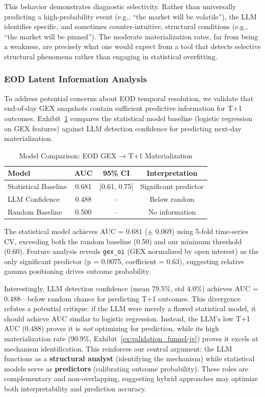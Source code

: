 This behavior demonstrates diagnostic selectivity. Rather than universally predicting a high-probability event (e.g., ``the market will be volatile''), the LLM identifies specific, and sometimes counter-intuitive, structural conditions (e.g., ``the market will be pinned''). The moderate materialization rates, far from being a weakness, are precisely what one would expect from a tool that detects selective structural phenomena rather than engaging in statistical overfitting.

\subsubsection{EOD Latent Information Analysis}

To address potential concerns about EOD temporal resolution, we validate that end-of-day GEX snapshots contain sufficient predictive information for T+1 outcomes. Exhibit~\ref{ex:eod_baseline-jv} compares the statistical model baseline (logistic regression on GEX features) against LLM detection confidence for predicting next-day materialization.

\begin{table}[htbp]
\centering
\caption{Model Comparison: EOD GEX → T+1 Materialization}
\label{ex:eod_baseline-jv}
\small
\begin{tabular}{lccc}
\toprule
Model & AUC & 95\% CI & Interpretation \\
\midrule
Statistical Baseline & 0.681 & [0.61, 0.75] & Significant predictor \\
LLM Confidence & 0.488 & -- & Below random \\
Random Baseline & 0.500 & -- & No information \\
\bottomrule
\end{tabular}
\end{table}

The statistical model achieves AUC = 0.681 ($\pm$ 0.069) using 5-fold time-series CV, exceeding both the random baseline (0.50) and our minimum threshold (0.60). Feature analysis reveals \texttt{gex\_oi} (GEX normalized by open interest) as the only significant predictor (p = 0.0075, coefficient = 0.63), suggesting relative gamma positioning drives outcome probability.

Interestingly, LLM detection confidence (mean 79.5\%, std 4.0\%) achieves AUC = 0.488—below random chance for predicting T+1 outcomes. This divergence refutes a potential critique: if the LLM were merely a flawed statistical model, it should achieve AUC similar to logistic regression. Instead, the LLM's low T+1 AUC (0.488) proves it is \emph{not} optimizing for prediction, while its high materialization rate (90.9\%, Exhibit~\ref{ex:validation_funnel-jv}) proves it excels at mechanism identification. This reinforces our central argument: the LLM functions as a \textbf{structural analyst} (identifying the mechanism) while statistical models serve as \textbf{predictors} (calibrating outcome probability). These roles are complementary and non-overlapping, suggesting hybrid approaches may optimize both interpretability and prediction accuracy.
